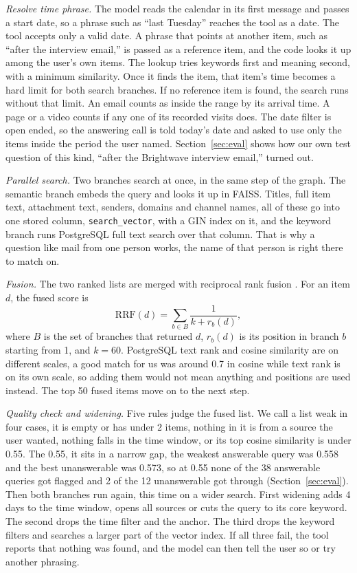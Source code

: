 \documentclass[conference]{IEEEtran}
\begin{document}
\textit{Resolve time phrase.} The model reads the calendar in its first message and passes a start date, so a phrase such as ``last Tuesday'' reaches the tool as a date. The tool accepts only a valid date. A phrase that points at another item, such as ``after the interview email,'' is passed as a reference item, and the code looks it up among the user's own items. The lookup tries keywords first and meaning second, with a minimum similarity. Once it finds the item, that item's time becomes a hard limit for both search branches. If no reference item is found, the search runs without that limit. An email counts as inside the range by its arrival time. A page or a video counts if any one of its recorded visits does. The date filter is open ended, so the answering call is told today's date and asked to use only the items inside the period the user named. Section~\ref{sec:eval} shows how our own test question of this kind, ``after the Brightwave interview email,'' turned out.

\textit{Parallel search.} Two branches search at once, in the same step of the graph. The semantic branch embeds the query and looks it up in FAISS. Titles, full item text, attachment text, senders, domains and channel names, all of these go into one stored column, \texttt{search\_vector}, with a GIN index on it, and the keyword branch runs PostgreSQL full text search over that column. That is why a question like mail from one person works, the name of that person is right there to match on.

\textit{Fusion.} The two ranked lists are merged with reciprocal rank fusion \cite{b9}. For an item $d$, the fused score is
\begin{equation}
\mathrm{RRF}(d) = \sum_{b \in B} \frac{1}{k + r_b(d)}, \label{eq:rrf}
\end{equation}
where $B$ is the set of branches that returned $d$, $r_b(d)$ is its position in branch $b$ starting from 1, and $k = 60$. PostgreSQL text rank and cosine similarity are on different scales, a good match for us was around 0.7 in cosine while text rank is on its own scale, so adding them would not mean anything and positions are used instead. The top 50 fused items move on to the next step.

\textit{Quality check and widening.} Five rules judge the fused list. We call a list weak in four cases, it is empty or has under 2 items, nothing in it is from a source the user wanted, nothing falls in the time window, or its top cosine similarity is under 0.55. The 0.55, it sits in a narrow gap, the weakest answerable query was 0.558 and the best unanswerable was 0.573, so at 0.55 none of the 38 answerable queries got flagged and 2 of the 12 unanswerable got through (Section~\ref{sec:eval}). Then both branches run again, this time on a wider search. First widening adds 4 days to the time window, opens all sources or cuts the query to its core keyword. The second drops the time filter and the anchor. The third drops the keyword filters and searches a larger part of the vector index. If all three fail, the tool reports that nothing was found, and the model can then tell the user so or try another phrasing.
\end{document}
